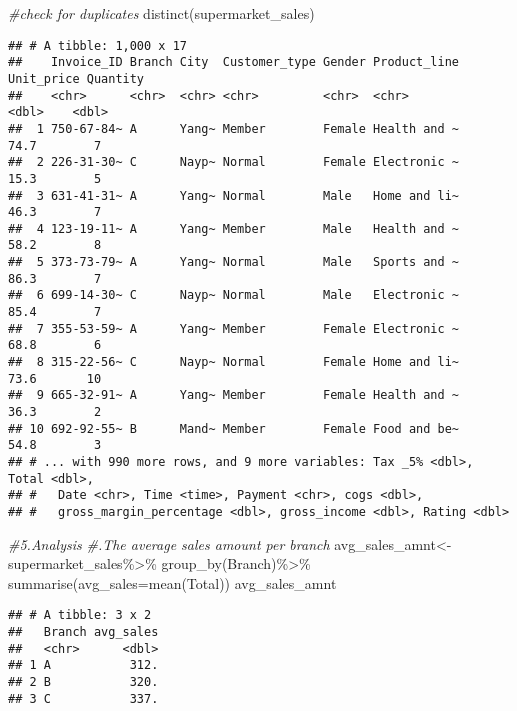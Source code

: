 \documentclass[
]{article}
\newenvironment{Shaded}{\begin{snugshade}}{\end{snugshade}}
\newcommand{\AttributeTok}[1]{\textcolor[rgb]{0.77,0.63,0.00}{#1}}
\newcommand{\CommentTok}[1]{\textcolor[rgb]{0.56,0.35,0.01}{\textit{#1}}}
\newcommand{\FunctionTok}[1]{\textcolor[rgb]{0.00,0.00,0.00}{#1}}
\newcommand{\NormalTok}[1]{#1}
\newcommand{\OtherTok}[1]{\textcolor[rgb]{0.56,0.35,0.01}{#1}}
\newcommand{\SpecialCharTok}[1]{\textcolor[rgb]{0.00,0.00,0.00}{#1}}
\begin{document}
\begin{Shaded}
\begin{Highlighting}[]
\CommentTok{\#check for duplicates}
\FunctionTok{distinct}\NormalTok{(supermarket\_sales)}
\end{Highlighting}
\end{Shaded}

\begin{verbatim}
## # A tibble: 1,000 x 17
##    Invoice_ID Branch City  Customer_type Gender Product_line Unit_price Quantity
##    <chr>      <chr>  <chr> <chr>         <chr>  <chr>             <dbl>    <dbl>
##  1 750-67-84~ A      Yang~ Member        Female Health and ~       74.7        7
##  2 226-31-30~ C      Nayp~ Normal        Female Electronic ~       15.3        5
##  3 631-41-31~ A      Yang~ Normal        Male   Home and li~       46.3        7
##  4 123-19-11~ A      Yang~ Member        Male   Health and ~       58.2        8
##  5 373-73-79~ A      Yang~ Normal        Male   Sports and ~       86.3        7
##  6 699-14-30~ C      Nayp~ Normal        Male   Electronic ~       85.4        7
##  7 355-53-59~ A      Yang~ Member        Female Electronic ~       68.8        6
##  8 315-22-56~ C      Nayp~ Normal        Female Home and li~       73.6       10
##  9 665-32-91~ A      Yang~ Member        Female Health and ~       36.3        2
## 10 692-92-55~ B      Mand~ Member        Female Food and be~       54.8        3
## # ... with 990 more rows, and 9 more variables: Tax _5% <dbl>, Total <dbl>,
## #   Date <chr>, Time <time>, Payment <chr>, cogs <dbl>,
## #   gross_margin_percentage <dbl>, gross_income <dbl>, Rating <dbl>
\end{verbatim}

\begin{Shaded}
\begin{Highlighting}[]
\CommentTok{\#5.Analysis}
\CommentTok{\#.The average sales amount per branch}
\NormalTok{avg\_sales\_amnt}\OtherTok{\textless{}{-}}\NormalTok{supermarket\_sales}\SpecialCharTok{\%\textgreater{}\%}
  \FunctionTok{group\_by}\NormalTok{(Branch)}\SpecialCharTok{\%\textgreater{}\%}
  \FunctionTok{summarise}\NormalTok{(}\AttributeTok{avg\_sales=}\FunctionTok{mean}\NormalTok{(Total))}
\NormalTok{avg\_sales\_amnt}
\end{Highlighting}
\end{Shaded}

\begin{verbatim}
## # A tibble: 3 x 2
##   Branch avg_sales
##   <chr>      <dbl>
## 1 A           312.
## 2 B           320.
## 3 C           337.
\end{verbatim}
\end{document}

